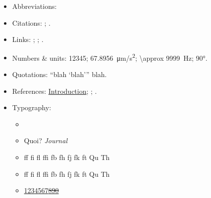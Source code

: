 \documentclass[a4paper, 11pt]{lt_article}
\begin{document}
\begin{itemize}

    \item Abbreviations:
        \eg \ie \cf \etc

    \item Citations:
        \textcite{Bayes};
        \autocite{GravitationalWaves}.

    \item Links:
        ;
        ;
        .

    \item Numbers \& units:
        \num{12345};
        \SI{67.8956}{\um/\s^2};
        \SI{\approx 9999}{Hz};
        \ang{90}.

    \item Quotations:
        \enquote{blah \enquote{blah}} blah.

    \item References:
        \hyperref[sec:Introduction]{Introduction};
        ;
        .

    \item Typography:
    \begin{itemize}
        \item \LuaTeX\ \LuaLaTeX
        \item Quoi? \textit{Journal}
        \item ff fi fl ffi fb fh fj fk ft Qu Th
        \item \textsf{ff fi fl ffi fb fh fj fk ft Qu Th}
        \item \uline{1234567\sout{890}}
    \end{itemize}

\end{itemize}

\begin{highlight}
    \blindtext
\end{highlight}

\end{document}
